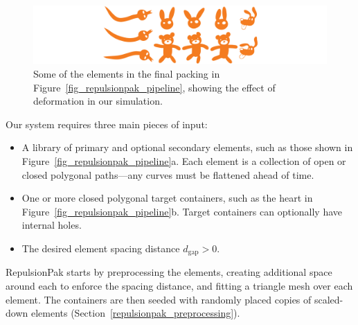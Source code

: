 \begin{figure}[h]
\centering
\includegraphics[width=1.0\textwidth]{figures/repulsionpak/pipeline_defviz_csk.pdf}
\caption[Element deformation]{
	\label{fig_defviz}
	Some of the elements in the final packing in Figure~\ref{fig_repulsionpak_pipeline}, 
	showing the effect of deformation in our simulation.
}
\end{figure}

Our system requires three main pieces of input:
\begin{itemize}
	\item A library of primary and optional secondary elements, such
		as those shown in Figure~\ref{fig_repulsionpak_pipeline}a.
	      Each element is a collection of 
		  open or closed polygonal paths---any curves must
		  be flattened ahead of time.
	\item One or more closed polygonal target containers, such as the
		heart in Figure~\ref{fig_repulsionpak_pipeline}b.  Target containers can optionally
		have internal holes.
	\item The desired element spacing distance $d_\mathrm{gap}>0$.
\end{itemize}

RepulsionPak starts by preprocessing the elements, creating additional space around
each to enforce the spacing distance, and fitting a triangle mesh over each element.
The containers are then seeded with randomly placed
copies of scaled-down elements 
(Section~\ref{repulsionpak_preprocessing}).


